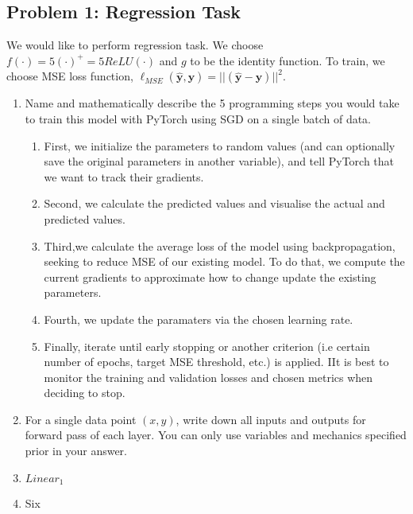 \documentclass{article}
\begin{document}
\subsection*{Problem 1: Regression Task}
We would like to perform regression task. We choose
$f(\cdot)=5(\cdot)^{+}=5ReLU(\cdot)$ and $g$ to be the identity function. To
train, we choose MSE loss function,
$\ell_{MSE}(\bm{\hat{y}},\bm{y})=||(\bm{\hat{y}}-\bm{y})||^2$.
\begin{enumerate}
  \item Name and mathematically describe the 5 programming steps you
        would take to train this model with PyTorch using SGD on a single batch
        of data.
        \begin{tcolorbox}
          \begin{enumerate}
            \item First, we initialize the parameters to random values (and can
                  optionally save the original parameters in another variable), and tell PyTorch
                  that we want to track their gradients.
            \item Second, we calculate the predicted values and visualise the actual and predicted values.
            \item Third,we calculate the average loss of the model using backpropagation, seeking to reduce MSE of our existing model. To do that, we compute the current gradients to approximate how to change update the existing parameters.
            \item Fourth, we update the paramaters via the chosen learning rate.
            \item Finally, iterate until early stopping or another criterion (i.e certain number of epochs, target MSE threshold, etc.) is applied. IIt is best to monitor the training and validation losses and chosen metrics when deciding to stop.
          \end{enumerate}
        \end{tcolorbox}
  \item For a single data point $(x,y)$, write down all inputs and outputs for forward pass of each layer. You can only use variables and mechanics specified prior in your answer.
  \item \begin{tcolorbox}
    $Linear_1$
  \end{tcolorbox}
  \item Six
\end{enumerate}
\end{document}
